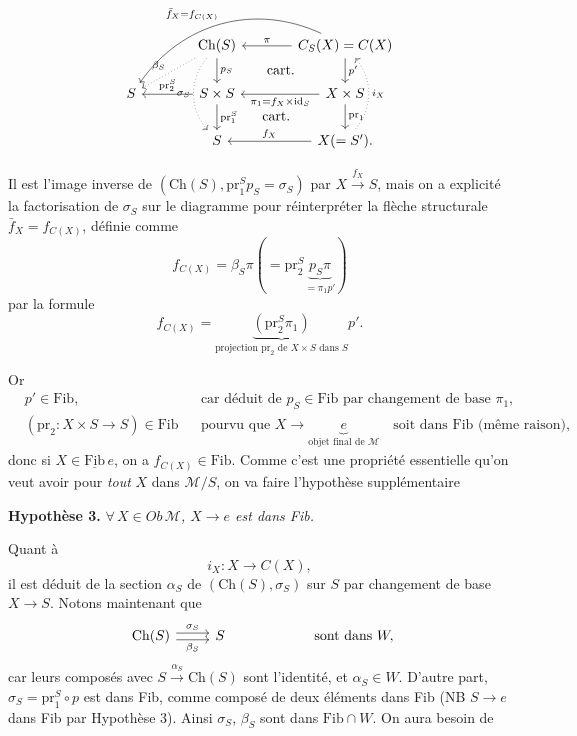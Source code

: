 \documentclass[11pt]{article}
\newcommand{\printedpage}[1]{\marginpar{\footnotesize p.~#1}}
\newcommand{\msp}[1]{\marginpar{\footnotesize [#1]}}
\newcommand{\Fib}{\underline{\mathrm{Fib}}}
\newcommand{\Ch}{\mathrm{Ch}}
\newcommand{\pr}{\mathrm{pr}}
\begin{document}
\printedpage{64}

\[
\begin{tikzcd}[column sep=large]
 & \Ch(S) \arrow[d, "p_S"] \arrow[dl, dotted, "\beta_S"'] \arrow[dd, dotted, bend right=40, "\sigma_S"'] \arrow[dr, phantom, "\text{cart.}"]
 & C_S(X)=C(X) \arrow[l, "\pi"'] \arrow[d, "p'"] \arrow[dll, bend right=40, "\bar f_X=f_{C(X)}"'] \\
S & S\times S \arrow[l, "\pr_2^S"'] \arrow[d, "\pr_1^S"] \arrow[dr, phantom, "\text{cart.}"]
 & X\times S \arrow[l, "\pi_1=f_X\times\mathrm{id}_S"] \arrow[d, "\pr_1"] \\
 & S & X(=S'). \arrow[l, "f_X"'] \arrow[uu, dotted, bend right=40, "i_X"']
\end{tikzcd}
\]

Il est l'image inverse de $(\Ch(S),\pr_1^Sp_S=\sigma_S)$ par $X\xrightarrow{f_X}S$, mais on a explicité la factorisation de $\sigma_S$ sur le diagramme pour réinterpréter la flèche structurale $\bar f_X=f_{C(X)}$, définie comme
\[
f_{C(X)}=\beta_S\pi(=\pr_2^S\underbrace{p_S\pi}_{=\pi_1p'})
\]
par la formule
\[
f_{C(X)}=\underbrace{(\pr_2^S\pi_1)}_{\text{projection } \pr_2 \text{ de } X\times S \text{ dans } S}p'.
\]

\msp{page 102}
Or
\[
\begin{aligned}
&p'\in\mathrm{Fib}, && \text{car déduit de } p_S\in\mathrm{Fib} \text{ par changement de base } \pi_1,\\
&(\pr_2 : X\times S\longrightarrow S)\in\mathrm{Fib} && \text{pourvu que } X\longrightarrow\underbrace{e}_{\text{objet final de } \mathcal{M}}\quad \text{soit dans Fib (même raison),}
\end{aligned}
\]
donc si $X\in\Fib\,e$, on a $f_{C(X)}\in\mathrm{Fib}$. Comme c'est une propriété essentielle qu'on veut avoir pour \textit{tout} $X$ dans $\mathcal{M}/S$, on va faire l'hypothèse supplémentaire

\textbf{Hypothèse 3.} \textit{$\forall\,X\in\mathit{Ob}\,\mathcal{M}$, $X\longrightarrow e$ est dans Fib.}

Quant à
\[
i_X : X\longrightarrow C(X),
\]
il est déduit de la section $\alpha_S$ de $(\Ch(S),\sigma_S)$ sur $S$ par changement de base $X\longrightarrow S$. Notons maintenant que
\[
\begin{tikzcd}
\Ch(S) \arrow[r, shift left, "\sigma_S"] \arrow[r, shift right, "\beta_S"'] & S
\end{tikzcd}
\qquad\qquad\qquad \text{sont dans } W,
\]
car leurs composés avec $S\xrightarrow{\alpha_S}\Ch(S)$ sont l'identité, et $\alpha_S\in W$. D'autre part, $\sigma_S=\pr_1^S\circ p$ est dans Fib, comme composé de deux éléments dans Fib (NB $S\longrightarrow e$ dans Fib par Hypothèse 3). Ainsi $\sigma_S$, $\beta_S$ sont dans $\mathrm{Fib}\cap W$. On aura besoin de %
\end{document}
